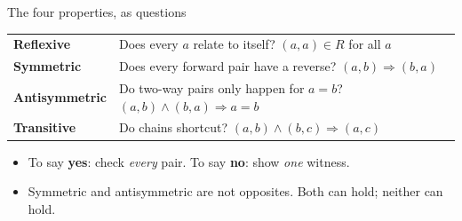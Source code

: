 \documentclass[aspectratio=169,10pt]{beamer}
\begin{document}
\begin{frame}{The four properties, as questions}
\begin{tabular}{@{}ll@{}}
\textbf{Reflexive} & Does every $a$ relate to itself? $(a,a)\in R$ for all $a$ \\[3pt]
\textbf{Symmetric} & Does every forward pair have a reverse? $(a,b)\Rightarrow(b,a)$ \\[3pt]
\textbf{Antisymmetric} & Do two-way pairs only happen for $a=b$? $(a,b)\wedge(b,a)\Rightarrow a=b$ \\[3pt]
\textbf{Transitive} & Do chains shortcut? $(a,b)\wedge(b,c)\Rightarrow(a,c)$ \\
\end{tabular}
\vspace{8pt}
\begin{itemize}
\item To say \textbf{yes}: check \emph{every} pair. To say \textbf{no}: show \emph{one} witness.
\item Symmetric and antisymmetric are not opposites. Both can hold; neither can hold.
\end{itemize}
\end{frame}
\end{document}
